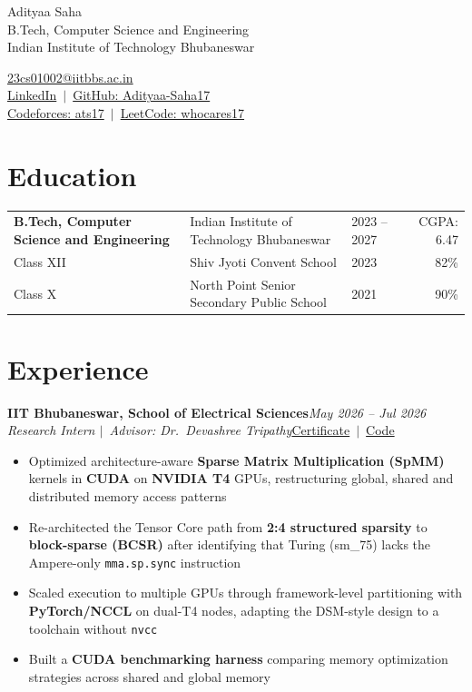 \documentclass[10pt,a4paper]{article}
\newcommand{\lnk}[2]{\href{#1}{\color{accent}#2}}
\newcommand{\entry}[4]{\textbf{#1}\hfill\textit{#2}\\[-1pt]{\small\textit{#3}}\hfill{\small #4}\vspace{-1pt}}
\begin{document}
\begin{minipage}[t]{0.6\textwidth}
  {\LARGE\color{accent}Adityaa Saha}\\[2pt]
  B.Tech, Computer Science and Engineering\\
  Indian Institute of Technology Bhubaneswar
\end{minipage}\hfill
\begin{minipage}[t]{0.38\textwidth}\raggedleft\small
  \lnk{mailto:23cs01002@iitbbs.ac.in}{23cs01002@iitbbs.ac.in}\\
  \lnk{https://www.linkedin.com/in/adityaa-saha-533b02299/}{LinkedIn}\ $|$\
  \lnk{https://github.com/Adityaa-Saha17}{GitHub: Adityaa-Saha17}\\
  \lnk{https://codeforces.com/profile/ats17}{Codeforces: ats17}\ $|$\
  \lnk{https://leetcode.com/u/whocares17/}{LeetCode: whocares17}
\end{minipage}

\section{Education}
{\small
\begin{tabularx}{\linewidth}{@{}l X l r@{}}
\textbf{B.Tech, Computer Science and Engineering} & Indian Institute of Technology Bhubaneswar & 2023 -- 2027 & CGPA: 6.47 \\
Class XII & Shiv Jyoti Convent School & 2023 & 82\% \\
Class X & North Point Senior Secondary Public School & 2021 & 90\% \\
\end{tabularx}}

\section{Experience}
\entry{IIT Bhubaneswar, School of Electrical Sciences}{May 2026 -- Jul 2026}{Research Intern $|$\ Advisor: Dr.\ Devashree Tripathy}{\lnk{https://drive.google.com/file/d/1WfAxMYu9Ciw2C3xp4QJN93tk1-4IyfOY/view?usp=sharing}{Certificate}\ $|$\ \lnk{https://github.com/Adityaa-Saha17/Sparse-Matrix-Multiplication}{Code}}
\begin{itemize}
  \item Optimized architecture-aware \textbf{Sparse Matrix Multiplication (SpMM)} kernels in \textbf{CUDA} on \textbf{NVIDIA T4} GPUs, restructuring global, shared and distributed memory access patterns
  \item Re-architected the Tensor Core path from \textbf{2:4 structured sparsity} to \textbf{block-sparse (BCSR)} after identifying that Turing (sm\_75) lacks the Ampere-only \texttt{mma.sp.sync} instruction
  \item Scaled execution to multiple GPUs through framework-level partitioning with \textbf{PyTorch/NCCL} on dual-T4 nodes, adapting the DSM-style design to a toolchain without \texttt{nvcc}
  \item Built a \textbf{CUDA benchmarking harness} comparing memory optimization strategies across shared and global memory
\end{itemize}
\end{document}

